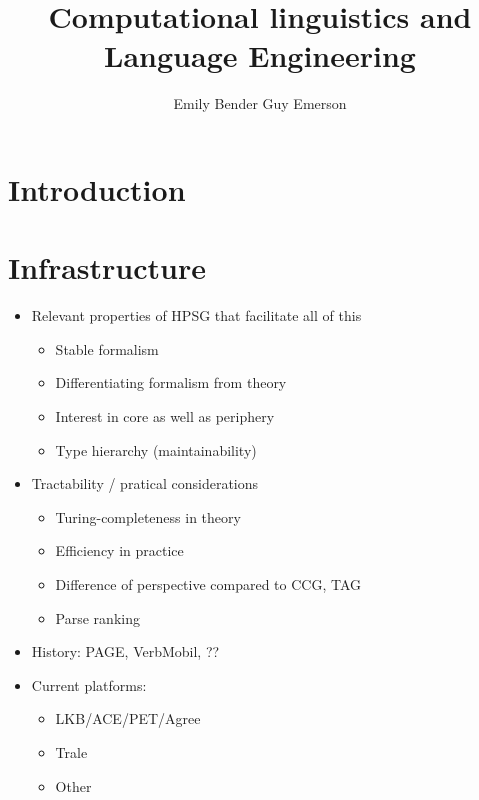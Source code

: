 \documentclass[output=paper]{langsci/langscibook}
\author{%
	Emily Bender\affiliation{University of Washington} \lastand
Guy Emerson\affiliation{Cambridge University}
}
\title{Computational linguistics and Language Engineering}
\begin{document}


\section{Introduction}


\section{Infrastructure}


\begin{itemize}
\item Relevant properties of HPSG that facilitate all of this  %

    \begin{itemize}
    \item Stable formalism
    \item Differentiating formalism from theory
    \item Interest in core as well as periphery
    \item Type hierarchy (maintainability)
    \end{itemize}

\item Tractability / pratical considerations  %
    \begin{itemize}
    \item Turing-completeness in theory
    \item Efficiency in practice
    \item Difference of perspective compared to CCG, TAG
    \item Parse ranking
    \end{itemize}

\item History: PAGE, VerbMobil, ?? %
\item Current platforms:
    \begin{itemize}
    \item LKB/ACE/PET/Agree
    \item Trale
    \item Other
    \end{itemize}
\end{itemize}
\end{document}
